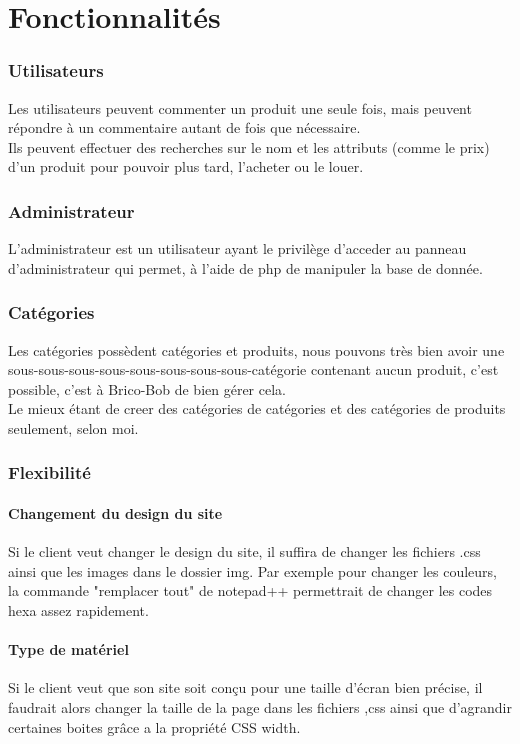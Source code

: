 \documentclass[10pt,a4paper]{article}
\begin{document}
	\part{Fonctionnalités}
		\section{Utilisateurs}
			Les utilisateurs peuvent commenter un produit une seule fois, mais peuvent répondre à un commentaire autant de fois que nécessaire.\\
			Ils peuvent effectuer des recherches sur le nom et les attributs (comme le prix) d'un produit pour pouvoir plus tard, l'acheter ou le louer.\\
			
		\section{Administrateur}
			L'administrateur est un utilisateur ayant le privilège d'acceder au panneau d'administrateur qui permet, à l'aide de php de manipuler la base de donnée.
		
		\section{Catégories}
			Les catégories possèdent catégories et produits, nous pouvons très bien avoir une sous-sous-sous-sous-sous-sous-sous-sous-catégorie contenant aucun produit, c'est possible, c'est à Brico-Bob de bien gérer cela.\\
			Le mieux étant de creer des catégories de catégories et des catégories de produits seulement, selon moi.
		\section{Flexibilité}
	
			\subsection{Changement du design du site}
	Si le client veut changer le design du site, il suffira de changer les fichiers .css ainsi que les images dans le dossier img. Par exemple pour changer les couleurs, la commande "remplacer tout" de notepad++ permettrait de changer les codes hexa assez rapidement.

\subsection{Type de matériel}
	Si le client veut que son site soit conçu pour une taille d'écran bien précise, il faudrait alors changer la taille de la page dans les fichiers ,css ainsi que d'agrandir certaines boites grâce a la propriété CSS width.
\end{document}

